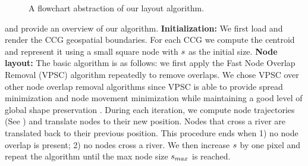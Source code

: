{\begin{figure}[b!]
    \caption{A flowchart abstraction of our layout algorithm.}
    \label{fig:flowchart}
\end{figure}
}

 and  provide an overview of our algorithm. \textbf{Initialization:} We first load and render the CCG geospatial boundaries. For each CCG we compute the centroid and represent it using a small square node with $ s $ as the initial size. \textbf{Node layout:} The basic algorithm is as follows: we first apply the Fast Node Overlap Removal (VPSC) algorithm \cite{dwyer2006fast} repeatedly to remove overlaps. We chose VPSC over other node overlap removal algorithms since VPSC is able to provide spread minimization and node movement minimization while maintaining a good level of global shape preservation \cite{chen2020Node}. During each iteration, we compute node trajectories (See ) and translate nodes to their new position. Nodes that cross a river are translated back to their previous position. This procedure ends when 1) no node overlap is present; 2) no nodes cross a river. We then increase $ s $ by one pixel and repeat the algorithm until the max node size $ s_{max} $ is reached. 


